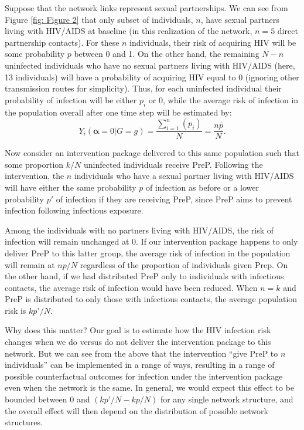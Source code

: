 \documentclass{article}
\theoremstyle{definition}
\begin{document}
Suppose that the network links represent sexual partnerships. We can see from Figure \ref{fig: Figure 2} that only subset of individuals, $n$, have sexual partners living with HIV/AIDS at baseline (in this realization of the network, $n=5$ direct partnership contacts). For these $n$ individuals, their risk of acquiring HIV will be some probability $p$ between 0 and 1. On the other hand, the remaining $N-n$ uninfected individuals who have no sexual partners living with HIV/AIDS (here, 13 individuals) will have a probability of acquiring HIV equal to 0 (ignoring other transmission routes for simplicity). Thus, for each uninfected individual their probability of infection will be either $p_i$ or 0, while the average risk of infection in the population overall after one time step will be estimated by:
\begin{equation}\label{eq:9}
Y_{i}\left(\mathbf{\alpha} =0|G=g\right) = \frac{\sum_{i=1}^{n}(p_{i})}{N} = \frac{n\bar{p}}{N}.
\end{equation}

Now consider an intervention package delivered to this same population such that some proportion $k/N$ uninfected individuals receive PreP.  Following the intervention, the $n$ individuals who have a sexual partner living with HIV/AIDS will have either the same probability $p$ of infection as before or a lower probability $p'$ of infection if they are receiving PreP, since PreP aims to prevent infection following infectious exposure. 

Among the individuals with no partners living with HIV/AIDS, the risk of infection will remain unchanged at 0. If our intervention package happens to only deliver PreP to this latter group, the average risk of infection in the population will remain at $np/N$ regardless of the proportion of individuals given Prep. On the other hand, if we had distributed PreP only to individuals with infectious contacts, the average risk of infection would have been reduced. When $n=k$ and PreP is distributed to only those with infectious contacts, the average population risk is $kp'/N$.

Why does this matter? Our goal is to estimate how the HIV infection risk changes when we do versus do not deliver the intervention package to this network. But we can see from the above that the intervention “give PreP to $n$ individuals” can be implemented in a range of ways, resulting in a range of possible counterfactual outcomes for infection under the intervention package even when the network is the same. In general, we would expect this effect to be bounded between 0 and $(kp'/N - kp/N)$ for any single network structure, and the overall effect will then depend on the distribution of possible network structures. 
\end{document}
